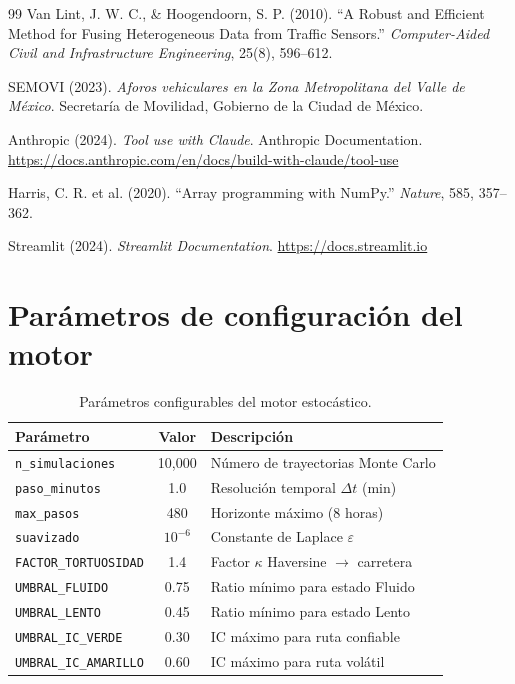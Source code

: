 \documentclass[11pt,a4paper]{article}
\begin{document}
\begin{thebibliography}{99}
Van Lint, J. W. C., \& Hoogendoorn, S. P. (2010). ``A Robust and Efficient Method for Fusing Heterogeneous Data from Traffic Sensors.'' \textit{Computer-Aided Civil and Infrastructure Engineering}, 25(8), 596--612.

SEMOVI (2023). \textit{Aforos vehiculares en la Zona Metropolitana del Valle de México}. Secretaría de Movilidad, Gobierno de la Ciudad de México.

Anthropic (2024). \textit{Tool use with Claude}. Anthropic Documentation. \url{https://docs.anthropic.com/en/docs/build-with-claude/tool-use}

Harris, C. R. et al. (2020). ``Array programming with NumPy.'' \textit{Nature}, 585, 357--362.

Streamlit (2024). \textit{Streamlit Documentation}. \url{https://docs.streamlit.io}

\end{thebibliography}

\appendix
\section{Parámetros de configuración del motor}

\begin{table}[H]
\centering
\small
\begin{tabular}{@{}lcl@{}}
\toprule
\textbf{Parámetro} & \textbf{Valor} & \textbf{Descripción} \\
\midrule
\texttt{n\_simulaciones} & 10{,}000 & Número de trayectorias Monte Carlo \\
\texttt{paso\_minutos} & 1.0 & Resolución temporal $\Delta t$ (min) \\
\texttt{max\_pasos} & 480 & Horizonte máximo (8 horas) \\
\texttt{suavizado} & $10^{-6}$ & Constante de Laplace $\varepsilon$ \\
\texttt{FACTOR\_TORTUOSIDAD} & 1.4 & Factor $\kappa$ Haversine $\to$ carretera \\
\texttt{UMBRAL\_FLUIDO} & 0.75 & Ratio mínimo para estado Fluido \\
\texttt{UMBRAL\_LENTO} & 0.45 & Ratio mínimo para estado Lento \\
\texttt{UMBRAL\_IC\_VERDE} & 0.30 & IC máximo para ruta confiable \\
\texttt{UMBRAL\_IC\_AMARILLO} & 0.60 & IC máximo para ruta volátil \\
\bottomrule
\end{tabular}
\caption{Parámetros configurables del motor estocástico.}
\end{table}
\end{document}
